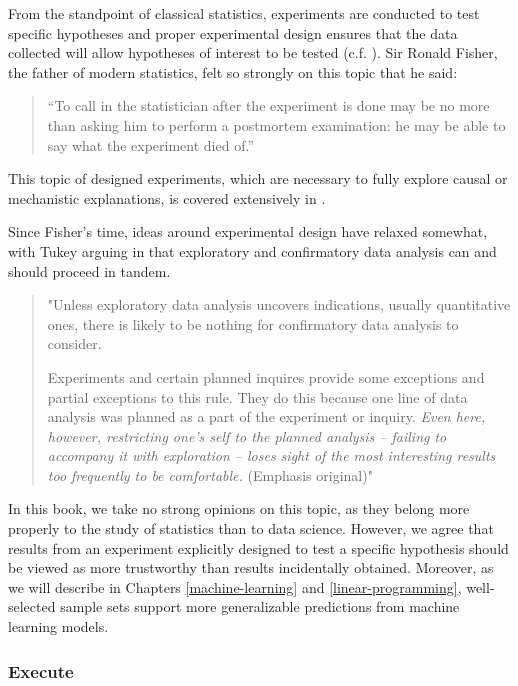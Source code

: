 \documentclass[
]{book}
\begin{document}
From the standpoint of classical statistics, experiments are conducted to test specific hypotheses and proper experimental design ensures that the data collected will allow hypotheses of interest to be tested (c.f. \citet{Fisher1935}). Sir Ronald Fisher, the father of modern statistics, felt so strongly on this topic that he said:

\begin{quote}
``To call in the statistician after the experiment is done may be no more than asking him to perform a postmortem examination: he may be able to say what the experiment died of.''
\end{quote}

This topic of designed experiments, which are necessary to fully explore causal or mechanistic explanations, is covered extensively in \citet{Lawson2014}.

Since Fisher's time, ideas around experimental design have relaxed somewhat, with Tukey arguing in \citet{Tukey1977} that exploratory and confirmatory data analysis can and should proceed in tandem.

\begin{quote}
"Unless exploratory data analysis uncovers indications, usually quantitative ones, there is likely to be nothing for confirmatory data analysis to consider.

Experiments and certain planned inquires provide some exceptions and partial exceptions to this rule. They do this because one line of data analysis was planned as a part of the experiment or inquiry. \emph{Even here, however, restricting one's self to the planned analysis -- failing to accompany it with exploration -- loses sight of the most interesting results too frequently to be comfortable.} (Emphasis original)"
\end{quote}

In this book, we take no strong opinions on this topic, as they belong more properly to the study of statistics than to data science. However, we agree that results from an experiment explicitly designed to test a specific hypothesis should be viewed as more trustworthy than results incidentally obtained. Moreover, as we will describe in Chapters \ref{machine-learning} and \ref{linear-programming}, well-selected sample sets support more generalizable predictions from machine learning models.

\hypertarget{execute}{%
\subsubsection{Execute}\label{execute}}
\end{document}
